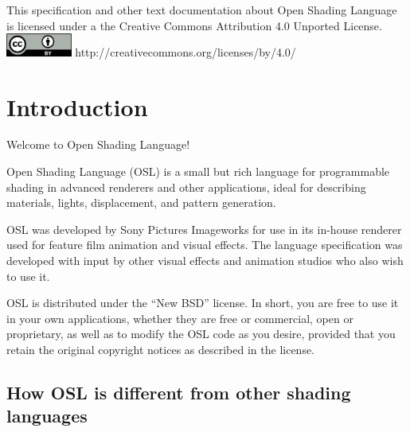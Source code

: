 \documentclass[11pt,letterpaper]{book}
\begin{document}
\vspace{0.5in}

This specification and other text documentation about Open Shading
Language is licensed under a the Creative Commons Attribution 4.0
Unported License. \\

\smallskip
\spc \includegraphics[width=0.85in]{Figures/CC-BY.png}
\spc http://creativecommons.org/licenses/by/4.0/
 \bigskip 



\newpage




\setcounter{tocdepth}{1}
\tableofcontents

\mainmatter


%


\chapter{Introduction}
\label{chap:intro}


Welcome to Open Shading Language!

\vspace*{0.2in}

Open Shading Language (OSL) is a small but rich language for
programmable shading in advanced renderers and other applications, ideal
for describing materials, lights, displacement, and pattern generation.

OSL was developed by Sony Pictures Imageworks for use in its in-house
renderer used for feature film animation and visual effects. The
language specification was developed with input by other visual effects
and animation studios who also wish to use it.

OSL is distributed under the ``New BSD'' license.  In short, you are free
to use it in your own applications, whether they are free or commercial,
open or proprietary, as well as to modify the OSL code as you desire,
provided that you retain the original copyright notices as described in
the license.


\section*{How OSL is different from other shading languages}
\end{document}
